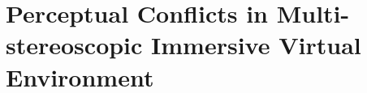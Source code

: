 \chapter{Perceptual Conflicts in Multi-stereoscopic Immersive Virtual Environment}
\label{chapter:perception}
